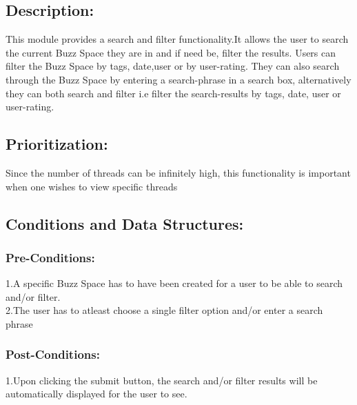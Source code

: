 \documentclass[a4paper,11pt]{article}
\begin{document}
\subsection*{Description:} This module provides a search and filter functionality.It allows the user to search the current Buzz Space they are in and if need be, filter the results. Users can filter the Buzz Space by tags, date,user or by user-rating. They can also search through the Buzz Space by entering a search-phrase in a search box, alternatively they can both search and filter i.e filter the search-results by tags, date, user or user-rating.\\
\subsection{Prioritization:} Since the number of threads can be infinitely high, this functionality is important when one wishes to view specific threads\\
\subsection{Conditions and Data Structures:}
\subsubsection*{Pre-Conditions:}
1.A specific Buzz Space has to have been created for a user to be able to search and/or filter.\\
2.The user has to atleast choose a single filter option and/or enter a search phrase\\
\subsubsection*{Post-Conditions:}
1.Upon clicking the submit button, the search and/or filter results will be automatically displayed for the user to see.\\
\end{document}
